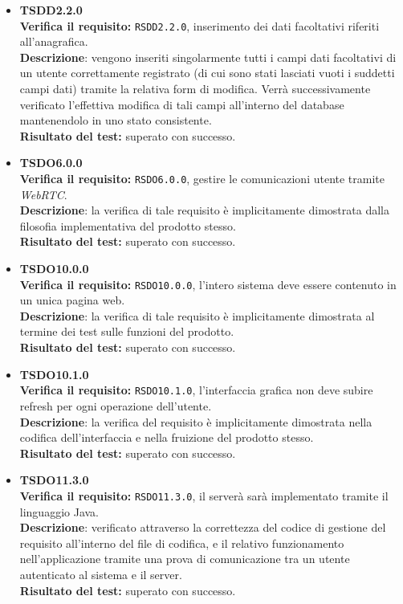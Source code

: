 \begin{itemize}
\item \textbf{TSDD2.2.0}\\
\textbf{Verifica il requisito:} \texttt{RSDD2.2.0}, inserimento dei dati facoltativi riferiti all'anagrafica.\\
\textbf{Descrizione}: vengono inseriti singolarmente tutti i campi dati facoltativi di un utente  correttamente registrato (di cui sono stati lasciati vuoti i suddetti campi dati) tramite la relativa form di modifica. Verrà successivamente verificato l'effettiva modifica di tali campi all'interno del database mantenendolo in uno stato consistente.\\
\textbf{Risultato del test:} superato con successo.


\item \textbf{TSDO6.0.0}\\
\textbf{Verifica il requisito:} \texttt{RSDO6.0.0}, gestire le comunicazioni utente tramite \textit{WebRTC}.\\
\textbf{Descrizione}: la verifica di tale requisito è implicitamente dimostrata dalla filosofia implementativa del prodotto stesso.\\
\textbf{Risultato del test:} superato con successo.

\item \textbf{TSDO10.0.0}\\
\textbf{Verifica il requisito:} \texttt{RSDO10.0.0}, l'intero sistema deve essere contenuto in un unica pagina web.\\
\textbf{Descrizione}: la verifica di tale requisito è implicitamente dimostrata al termine dei test sulle funzioni del prodotto.\\
\textbf{Risultato del test:} superato con successo.

\item \textbf{TSDO10.1.0}\\
\textbf{Verifica il requisito:} \texttt{RSDO10.1.0}, l'interfaccia grafica non deve subire refresh per ogni operazione dell'utente.\\
\textbf{Descrizione}: la verifica del requisito è implicitamente dimostrata nella codifica dell'interfaccia e nella fruizione del prodotto stesso.\\
\textbf{Risultato del test:} superato con successo.

\item \textbf{TSDO11.3.0}\\
\textbf{Verifica il requisito:} \texttt{RSDO11.3.0}, il serverà sarà implementato tramite il linguaggio Java.\\
\textbf{Descrizione}: verificato attraverso la correttezza del codice di gestione del requisito all'interno del file di codifica, e il relativo funzionamento nell'applicazione tramite una prova di comunicazione tra un utente autenticato al sistema e il server.\\
\textbf{Risultato del test:} superato con successo.


\end{itemize}

